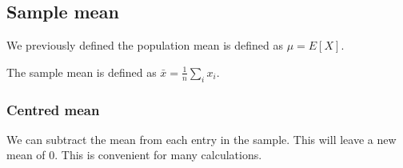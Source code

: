 
\subsection{Sample mean}

We previously defined the population mean is defined as \(\mu=E[X]\).

The sample mean is defined as \(\bar x = \frac{1}{n}\sum_i x_i\).

\subsubsection{Centred mean}

We can subtract the mean from each entry in the sample. This will leave a new mean of \(0\). This is convenient for many calculations.

